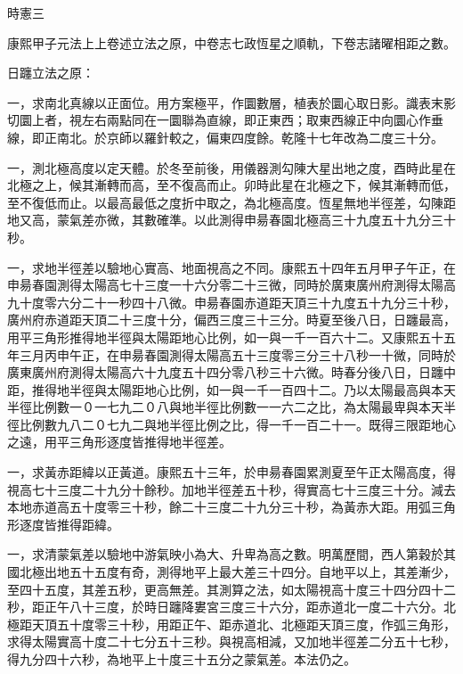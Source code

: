 
\begin{pinyinscope}
時憲三

康熙甲子元法上上卷述立法之原，中卷志七政恆星之順軌，下卷志諸曜相距之數。

日躔立法之原：

一，求南北真線以正面位。用方案極平，作圜數層，植表於圜心取日影。識表末影切圜上者，視左右兩點同在一圜聯為直線，即正東西；取東西線正中向圜心作垂線，即正南北。於京師以羅針較之，偏東四度餘。乾隆十七年改為二度三十分。

一，測北極高度以定天體。於冬至前後，用儀器測勾陳大星出地之度，酉時此星在北極之上，候其漸轉而高，至不復高而止。卯時此星在北極之下，候其漸轉而低，至不復低而止。以最高最低之度折中取之，為北極高度。恆星無地半徑差，勾陳距地又高，蒙氣差亦微，其數確準。以此測得申昜春園北極高三十九度五十九分三十秒。

一，求地半徑差以驗地心實高、地面視高之不同。康熙五十四年五月甲子午正，在申昜春園測得太陽高七十三度一十六分零二十三微，同時於廣東廣州府測得太陽高九十度零六分二十一秒四十八微。申昜春園赤道距天頂三十九度五十九分三十秒，廣州府赤道距天頂二十三度十分，偏西三度三十三分。時夏至後八日，日躔最高，用平三角形推得地半徑與太陽距地心比例，如一與一千一百六十二。又康熙五十五年三月丙申午正，在申昜春園測得太陽高五十三度零三分三十八秒一十微，同時於廣東廣州府測得太陽高六十九度五十四分零八秒三十六微。時春分後八日，日躔中距，推得地半徑與太陽距地心比例，如一與一千一百四十二。乃以太陽最高與本天半徑比例數一０一七九二０八與地半徑比例數一一六二之比，為太陽最卑與本天半徑比例數九八二０七九二與地半徑比例之比，得一千一百二十一。既得三限距地心之遠，用平三角形逐度皆推得地半徑差。

一，求黃赤距緯以正黃道。康熙五十三年，於申昜春園累測夏至午正太陽高度，得視高七十三度二十九分十餘秒。加地半徑差五十秒，得實高七十三度三十分。減去本地赤道高五十度零三十秒，餘二十三度二十九分三十秒，為黃赤大距。用弧三角形逐度皆推得距緯。

一，求清蒙氣差以驗地中游氣映小為大、升卑為高之數。明萬歷間，西人第穀於其國北極出地五十五度有奇，測得地平上最大差三十四分。自地平以上，其差漸少，至四十五度，其差五秒，更高無差。其測算之法，如太陽視高十度三十四分四十二秒，距正午八十三度，於時日躔降婁宮三度三十六分，距赤道北一度二十六分。北極距天頂五十度零三十秒，用距正午、距赤道北、北極距天頂三度，作弧三角形，求得太陽實高十度二十七分五十三秒。與視高相減，又加地半徑差二分五十七秒，得九分四十六秒，為地平上十度三十五分之蒙氣差。本法仍之。


\end{pinyinscope}

